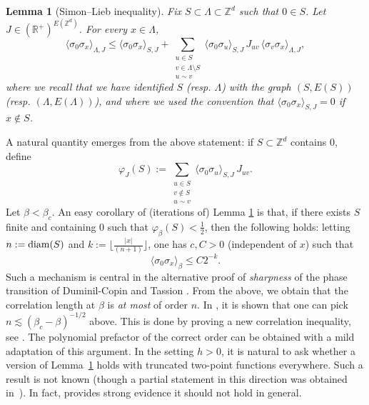 \documentclass[11pt,a4paper]{article}
\numberwithin{equation}{section}
\theoremstyle{plain}
\newtheorem{Lem}[Thm]{Lemma}
\theoremstyle{definition}
\begin{document}
\begin{Lem}[Simon--Lieb inequality]\label{lem:SL} Fix $S\subset \Lambda\subset \mathbb Z^d$ such that $0\in S$. Let $J\in (\mathbb R^+)^{E(\mathbb Z^d)}$. For every $x\in \Lambda$,
\begin{equation}
	\langle \sigma_0\sigma_x\rangle_{\Lambda,J}\leq  \langle \sigma_0\sigma_x\rangle_{S,J}+\sum_{\substack{u\in S\\ v\in \Lambda\setminus S\\u\sim v}}\langle \sigma_0\sigma_u\rangle_{S,J}\,J_{uv} \,\langle \sigma_v\sigma_x\rangle_{\Lambda,J},
\end{equation}
where we recall that we have identified $S$ (resp. $\Lambda$) with the graph $(S,E(S))$ (resp. $(\Lambda,E(\Lambda))$), and where we used the convention that $\langle \sigma_0\sigma_x\rangle_{S,J}=0$ if $x\notin S$.
\end{Lem}
A natural quantity emerges from the above statement: if $S\subset \mathbb Z^d$ contains $0$, define
\begin{equation}\label{eq: def phi}
	\varphi_J(S):= \sum_{\substack{u\in S\\ v\notin S\\u\sim v}}\langle \sigma_0\sigma_u\rangle_{S,J}\,J_{uv}.
\end{equation}
Let $\beta<\beta_c$. An easy corollary of (iterations of) Lemma \ref{lem:SL} is that, if there exists $S$ finite and containing $0$ such that $\varphi_\beta(S)< \tfrac{1}{2}$, then the following holds: letting $n:=\textup{diam}(S)$ and $k:=\lfloor \tfrac{|x|}{(n+1)}\rfloor$, one has $c,C>0$ (independent of $x$) such that 
\begin{equation}
	\langle \sigma_0\sigma_x\rangle_{\beta}\leq C2^{-k}.
\end{equation}
Such a mechanism is central in the alternative proof of \emph{sharpness} of the phase transition of Duminil-Copin and Tassion \cite{DuminilTassionNewProofSharpness2016}. From the above, we obtain that the correlation length at $\beta$ is \emph{at most} of order $n$. In \cite{DuminilPanis2024newLB}, it is shown that one can pick $n\lesssim (\beta_c-\beta)^{-1/2}$ above. This is done by proving a new correlation inequality, see \cite[Theorem~1.2]{DuminilPanis2024newLB}. The polynomial prefactor of the correct order can be obtained with a mild adaptation of this argument. In the setting $h>0$, it is natural to ask whether a version of Lemma~\ref{lem:SL} holds with truncated two-point functions everywhere. Such a result is not known (though a partial statement 
in this direction was obtained in~\cite{graham1982correlation}). In fact, 
\cite{BakerBessis1981} provides strong evidence it should not hold in general.
\end{document}
